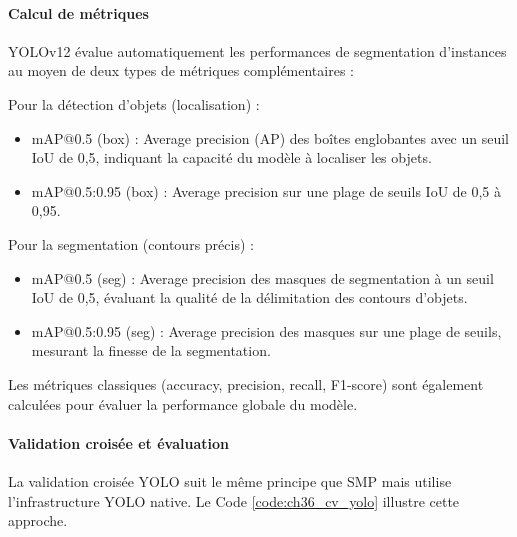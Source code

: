 \paragraph{Calcul de métriques}
YOLOv12 évalue automatiquement les performances de segmentation d'instances au moyen de deux types de métriques complémentaires :

Pour la détection d'objets (localisation) :
\begin{itemize}
    \item mAP@0.5 (box) : Average precision (AP) des boîtes englobantes avec un seuil IoU de 0,5, indiquant la capacité du modèle à localiser les objets.
    \item mAP@0.5:0.95 (box) : Average precision sur une plage de seuils IoU de 0,5 à 0,95.
\end{itemize}

Pour la segmentation (contours précis) :
\begin{itemize}
    \item mAP@0.5 (seg) : Average precision des masques de segmentation à un seuil IoU de 0,5, évaluant la qualité de la délimitation des contours d'objets.
    \item mAP@0.5:0.95 (seg) : Average precision des masques sur une plage de seuils, mesurant la finesse de la segmentation.
\end{itemize}

Les métriques classiques (accuracy, precision, recall, F1-score) sont également calculées pour évaluer la performance globale du modèle.

\paragraph{Validation croisée et évaluation}
La validation croisée YOLO suit le même principe que SMP mais utilise l'infrastructure YOLO native. Le Code \ref{code:ch36_cv_yolo} illustre cette approche.


